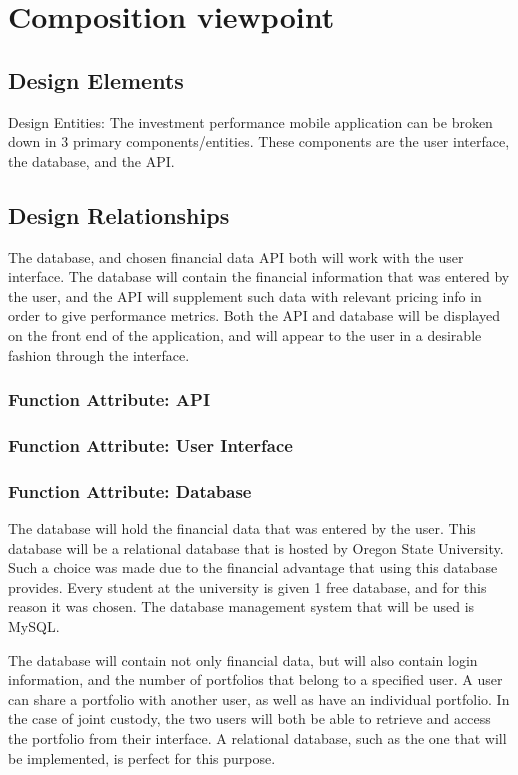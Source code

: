 \documentclass[onecolumn, draftclsnofoot,10pt, compsoc]{IEEEtran}
\begin{document}
\section{Composition viewpoint}
\subsection{Design Elements}
	Design Entities: The investment performance mobile application can be broken down in 3 primary components/entities. These components are the user interface, the database, and the API.

\subsection{Design Relationships}
	The database, and chosen financial data API both will work with the user interface. The database will contain the financial information that was entered by the user, and the API will 
	supplement such data with relevant pricing info in order to give performance metrics. Both the API and database will be displayed on the front end of the application, and will appear
	to the user in a desirable fashion through the interface.

\subsubsection{Function Attribute: API}
\subsubsection{Function Attribute: User Interface}
\subsubsection{Function Attribute: Database}
	The database will hold the financial data that was entered by the user. This database will be a relational database that is hosted by Oregon State University. Such a choice was 
	made due to the financial advantage that using this database provides. Every student at the university is given 1 free database, and for this reason it was chosen. The database 
	management system that will be used is MySQL.

	The database will contain not only financial data, but will also contain login information, and the number of portfolios that belong to a specified user. A user can share a portfolio 
	with another user, as well as have an individual portfolio. In the case of joint custody, the two users will both be able to retrieve and access the portfolio from their interface. 
	A relational database, such as the one that will be implemented, is perfect for this purpose.
\end{document}
